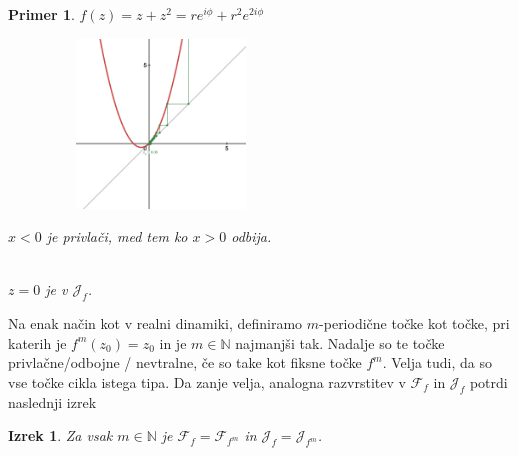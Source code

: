 \documentclass{article}
\newtheorem{primer}{Primer}
\newtheorem{izrek}{Izrek}
\newcommand{\N}{\mathbb{N}}
\newcommand{\F}{\mathcal{F}}
\begin{document}
\begin{enumerate}
    \begin{primer}
    $f(z) = z + z^2 = r e^{i\phi} + r^2 e^{2i\phi}$

    \begin{figure}[h]
        \begin{center}
            \includegraphics[width=6cm, height=4.5cm]{Grafi/cobweb20.png}
        \end{center}
    \end{figure}
    $x < 0$ je privlači, med tem ko $x > 0$ odbija.

        \\
        $z = 0$ je v $\mathcal{J}_f$.
    \end{primer}
\end{enumerate}

Na enak način kot v realni dinamiki, definiramo $m$-periodične 
točke kot točke, pri katerih je $f^m(z_0) = z_0$ in je $m\in \N$
najmanjši tak. Nadalje so te točke privlačne\slash odbojne \slash 
nevtralne, če so take kot fiksne točke $f^m$. Velja tudi, da so 
vse točke cikla istega tipa. Da zanje velja, analogna razvrstitev 
v $\F_f$ in $\mathcal{J}_f$ potrdi naslednji izrek 
\begin{izrek}
Za vsak $m\in \N$ je $\F_f = \F_{f^m}$ in $\mathcal{J}_f = \mathcal{J}_{f^m}$.
\end{izrek}
\end{document}

